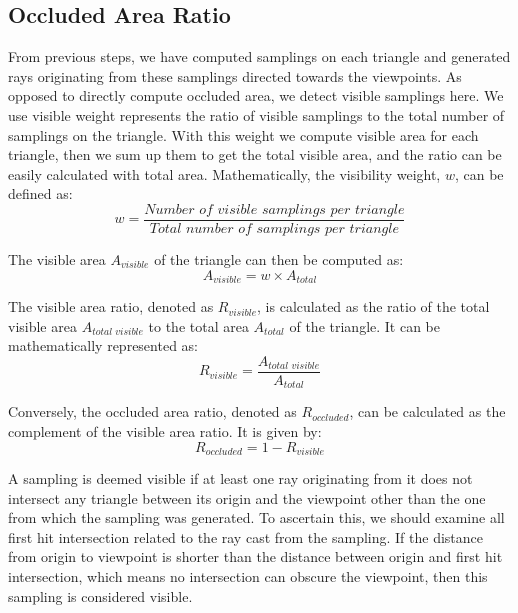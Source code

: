 \documentclass[11pt, a4paper,oneside,chapterprefix=false]{scrbook}
\begin{document}
\subsection{Occluded Area Ratio}

From previous steps, we have computed samplings on each triangle and generated rays originating from these samplings directed towards the viewpoints. As opposed to directly compute occluded area, we detect visible samplings here. We use visible weight represents the ratio of visible samplings to the total number of samplings on the triangle. With this weight we compute visible area for each triangle, then we sum up them to get the total visible area, and the ratio can be easily calculated with total area. Mathematically, the visibility weight, \( w \), can be defined as:
\[ 
    w = \frac{\textit{Number of visible samplings per triangle}}{\textit{Total number of samplings per triangle}}
\]

The visible area \( A_{\textit{visible}} \) of the triangle can then be computed as:
\[ 
    A_{\textit{visible}} = w \times A_{\textit{total}}
\]

The visible area ratio, denoted as \( R_{\textit{visible}} \), is calculated as the ratio of the total visible area \( A_{\textit{total visible}} \) to the total area \( A_{\textit{total}} \) of the triangle. It can be mathematically represented as:
\[ 
    R_{\textit{visible}} = \frac{A_{\textit{total visible}}}{A_{\textit{total}}}
\]

Conversely, the occluded area ratio, denoted as \( R_{\textit{occluded}} \), can be calculated as the complement of the visible area ratio. It is given by:
\[ 
    R_{\textit{occluded}} = 1 - R_{\textit{visible}}
\]

A sampling is deemed visible if at least one ray originating from it does not intersect any triangle between its origin and the viewpoint other than the one from which the sampling was generated. To ascertain this, we should examine all first hit intersection related to the ray cast from the sampling. If the distance from origin to viewpoint is shorter than the distance between origin and first hit intersection, which means no intersection can obscure the viewpoint, then this sampling is considered visible. 
\end{document}
